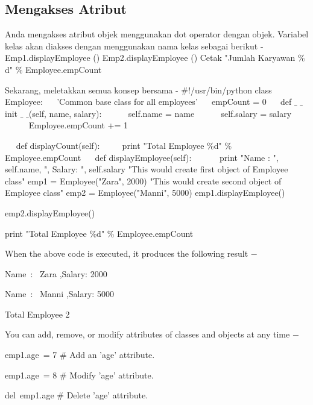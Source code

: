 {\subsection{Mengakses Atribut}
Anda mengakses atribut objek menggunakan dot operator dengan objek. Variabel kelas akan diakses dengan menggunakan nama kelas sebagai berikut - 
\vspace{12pt}
\noindent 
Emp1.displayEmployee () 
\noindent 
Emp2.displayEmployee ()
\noindent 
Cetak "Jumlah Karyawan $  \%  $ d" $  \%  $ Employee.empCount 
\vspace{12pt}
\noindent

Sekarang, meletakkan semua konsep bersama - 
\noindent 
 $  \#  $!/usr/bin/python 
\vspace{12pt}
\noindent 
class Employee: 
\noindent 
~~ 'Common base class for all employees' 
\noindent 
~~ empCount = 0 
\vspace{12pt}
\noindent 
~~ def  $  \_  $ $  \_  $init $  \_  $ $  \_  $(self, name, salary): 
\noindent 
~~~~~ self.name = name 
\noindent 
~~~~~ self.salary = salary 
\noindent 
~~~~~ Employee.empCount += 1 
\noindent 
~~  \par
\noindent 
~~ def displayCount(self): 
\noindent 
~~~~ print "Total Employee  $  \%  $d"  $  \%  $ Employee.empCount 
\vspace{12pt}
\noindent 
~~ def displayEmployee(self): 
\noindent 
~~~~~~print "Name : ", self.name,  ", Salary: ", self.salary 
\vspace{12pt}
\noindent 
"This would create first object of Employee class" 
\noindent 
emp1 = Employee("Zara", 2000) 
\noinde
"This would create second object of Employee class" 
\noindent 
emp2 = Employee("Manni", 5000) 
\noindent 
emp1.displayEmployee() \par
\noindent 
emp2.displayEmployee() \par
\noindent 
print "Total Employee  $  \%  $d"  $  \%  $ Employee.empCount \par
\noindent 
When the above code is executed, it produces the following result  $ - $ \par
\noindent 
Name~:~ Zara ,Salary:  2000 \par
\noindent 
Name~:~ Manni ,Salary:  5000 \par
\noindent 
Total Employee 2 \par
\noindent 
You can add, remove, or modify attributes of classes and objects at any time  $ - $ \par
\noindent 
emp1.age~= 7   $  \#  $ Add an 'age' attribute. \par
\noindent 
emp1.age~= 8   $  \#  $ Modify 'age' attribute. \par
\noindent 
del~emp1.age   $  \#  $ Delete 'age' attribute. \par
\vspace{12pt}

}
